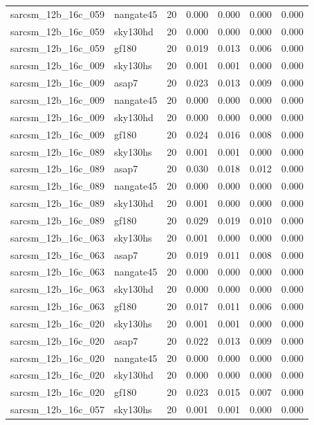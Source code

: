 \begin{tabular}{llrrrrr}
sarcsm\_12b\_16c\_059 & nangate45 & 20 & 0.000 & 0.000 & 0.000 & 0.000 \\
sarcsm\_12b\_16c\_059 & sky130hd & 20 & 0.000 & 0.000 & 0.000 & 0.000 \\
sarcsm\_12b\_16c\_059 & gf180 & 20 & 0.019 & 0.013 & 0.006 & 0.000 \\
sarcsm\_12b\_16c\_009 & sky130hs & 20 & 0.001 & 0.001 & 0.000 & 0.000 \\
sarcsm\_12b\_16c\_009 & asap7 & 20 & 0.023 & 0.013 & 0.009 & 0.000 \\
sarcsm\_12b\_16c\_009 & nangate45 & 20 & 0.000 & 0.000 & 0.000 & 0.000 \\
sarcsm\_12b\_16c\_009 & sky130hd & 20 & 0.000 & 0.000 & 0.000 & 0.000 \\
sarcsm\_12b\_16c\_009 & gf180 & 20 & 0.024 & 0.016 & 0.008 & 0.000 \\
sarcsm\_12b\_16c\_089 & sky130hs & 20 & 0.001 & 0.001 & 0.000 & 0.000 \\
sarcsm\_12b\_16c\_089 & asap7 & 20 & 0.030 & 0.018 & 0.012 & 0.000 \\
sarcsm\_12b\_16c\_089 & nangate45 & 20 & 0.000 & 0.000 & 0.000 & 0.000 \\
sarcsm\_12b\_16c\_089 & sky130hd & 20 & 0.001 & 0.000 & 0.000 & 0.000 \\
sarcsm\_12b\_16c\_089 & gf180 & 20 & 0.029 & 0.019 & 0.010 & 0.000 \\
sarcsm\_12b\_16c\_063 & sky130hs & 20 & 0.001 & 0.000 & 0.000 & 0.000 \\
sarcsm\_12b\_16c\_063 & asap7 & 20 & 0.019 & 0.011 & 0.008 & 0.000 \\
sarcsm\_12b\_16c\_063 & nangate45 & 20 & 0.000 & 0.000 & 0.000 & 0.000 \\
sarcsm\_12b\_16c\_063 & sky130hd & 20 & 0.000 & 0.000 & 0.000 & 0.000 \\
sarcsm\_12b\_16c\_063 & gf180 & 20 & 0.017 & 0.011 & 0.006 & 0.000 \\
sarcsm\_12b\_16c\_020 & sky130hs & 20 & 0.001 & 0.001 & 0.000 & 0.000 \\
sarcsm\_12b\_16c\_020 & asap7 & 20 & 0.022 & 0.013 & 0.009 & 0.000 \\
sarcsm\_12b\_16c\_020 & nangate45 & 20 & 0.000 & 0.000 & 0.000 & 0.000 \\
sarcsm\_12b\_16c\_020 & sky130hd & 20 & 0.000 & 0.000 & 0.000 & 0.000 \\
sarcsm\_12b\_16c\_020 & gf180 & 20 & 0.023 & 0.015 & 0.007 & 0.000 \\
sarcsm\_12b\_16c\_057 & sky130hs & 20 & 0.001 & 0.001 & 0.000 & 0.000 \\

\end{tabular}
